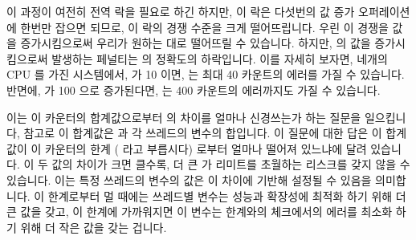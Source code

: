 이 과정이 여전히 전역 락을 필요로 하긴 하지만, 이 락은 다섯번의 값 증가
오퍼레이션에 한번만 잡으면 되므로, 이 락의 경쟁 수준을 크게 떨어뜨립니다.
우린 이 경쟁을  값을 증가시킴으로써 우리가 원하는 대로 떨어뜨릴
수 있습니다.
하지만,  의 값을 증가시킴으로써 발생하는 페널티는
 의 정확도의 하락입니다.
이를 자세히 보자면, 네개의 CPU 를 가진 시스템에서,  가 10 이면,
 는 최대 40 카운트의 에러를 가질 수 있습니다.
반면에,  가 100 으로 증가된다면,  는 400
카운트의 에러까지도 가질 수 있습니다.

이는 이 카운터의 합계값으로부터  의 차이를 얼마나 신경쓰는가
하는 질문을 일으킵니다, 참고로 이 합계값은  과 각 쓰레드의
 변수의 합입니다.
이 질문에 대한 답은 이 합계값이 이 카운터의 한계 ( 라고
부릅시다) 로부터 얼마나 떨어져 있느냐에 달려 있습니다.
이 두 값의 차이가 크면 클수록, 더 큰  가 
리미트를 초월하는 리스크를 갖지 않을 수 있습니다.
이는 특정 쓰레드의  변수의 값은 이 차이에 기반해 설정될 수
있음을 의미합니다.
이 한계로부터 멀 때에는 쓰레드별  변수는 성능과 확장성에 최적화
하기 위해 더 큰 값을 갖고, 이 한계에 가까워지면 이 변수는 
한계와의 체크에서의 에러를 최소화 하기 위해 더 작은 값을 갖는 겁니다.

